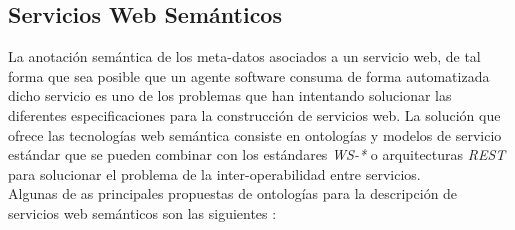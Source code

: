 \subsection{Servicios Web Sem\'anticos}

La anotaci\'on sem\'antica de los meta-datos asociados a un servicio web, de tal forma que sea posible que un agente software consuma de forma automatizada dicho servicio es uno de los problemas que han intentando solucionar las diferentes especificaciones para la construcci\'on de servicios web. La soluci\'on que ofrece las tecnolog\'ias web sem\'antica consiste en ontolog\'ias y modelos de servicio est\'andar que se pueden combinar con los est\'andares \textit{WS-*} o arquitecturas \textit{REST} para solucionar el problema de la inter-operabilidad entre servicios.\\
Algunas de as principales propuestas de ontolog\'ias para la descripci\'on de servicios web sem\'anticos son las siguientes \cite{lanthaler2010semantic}:

